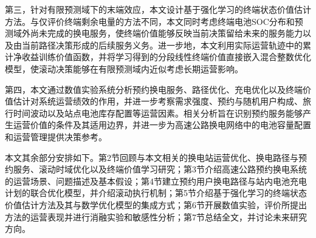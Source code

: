 第三，针对有限预测域下的末端效应，本文设计基于强化学习的终端状态价值估计方法。与仅评价终端剩余电量的方法不同，本文同时考虑终端电池SOC分布和预测域外尚未完成的换电服务，使终端价值能够反映当前决策留给未来的服务能力以及由当前路径决策形成的后续服务义务。进一步地，本文利用实际运营轨迹中的累计净收益训练价值函数，并将学习得到的分段线性终端价值直接嵌入混合整数优化模型，使滚动决策能够在有限预测域内近似考虑长期运营影响。

第四，本文通过数值实验系统分析预约换电服务、路径优化、充电优化以及终端价值估计对系统运营绩效的作用，并进一步考察需求强度、预约与随机用户构成、旅行时间波动以及站点电池库存配置等运营因素。相关分析旨在识别预约服务能够产生运营价值的条件及其适用边界，并进一步为高速公路换电网络中的电池容量配置和运营管理提供决策参考。

本文其余部分安排如下。第2节回顾与本文相关的换电站运营优化、换电路径与预约服务、滚动时域优化以及终端价值学习研究；第3节介绍高速公路预约换电系统的运营场景、问题描述及基本假设；第4节建立预约用户换电路径与站内电池充电计划的联合优化模型，并介绍滚动执行机制；第5节介绍基于强化学习的终端状态价值估计方法及其与数学优化模型的集成方式；第6节开展数值实验，评价所提出方法的运营表现并进行消融实验和敏感性分析；第7节总结全文，并讨论未来研究方向。








